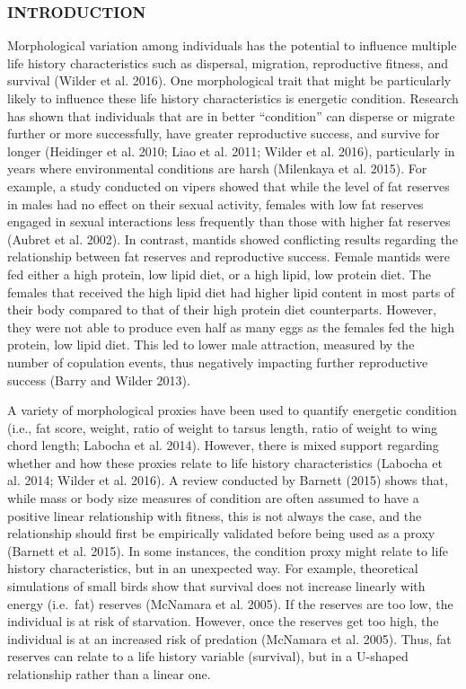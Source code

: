 \documentclass[
]{article}
\begin{document}
\hypertarget{introduction}{%
\subsubsection{INTRODUCTION}\label{introduction}}

Morphological variation among individuals has the potential to influence
multiple life history characteristics such as dispersal, migration,
reproductive fitness, and survival (Wilder et al. 2016). One
morphological trait that might be particularly likely to influence these
life history characteristics is energetic condition. Research has shown
that individuals that are in better ``condition'' can disperse or
migrate further or more successfully, have greater reproductive success,
and survive for longer (Heidinger et al. 2010; Liao et al. 2011; Wilder
et al. 2016), particularly in years where environmental conditions are
harsh (Milenkaya et al. 2015). For example, a study conducted on vipers
showed that while the level of fat reserves in males had no effect on
their sexual activity, females with low fat reserves engaged in sexual
interactions less frequently than those with higher fat reserves (Aubret
et al. 2002). In contrast, mantids showed conflicting results regarding
the relationship between fat reserves and reproductive success. Female
mantids were fed either a high protein, low lipid diet, or a high lipid,
low protein diet. The females that received the high lipid diet had
higher lipid content in most parts of their body compared to that of
their high protein diet counterparts. However, they were not able to
produce even half as many eggs as the females fed the high protein, low
lipid diet. This led to lower male attraction, measured by the number of
copulation events, thus negatively impacting further reproductive
success (Barry and Wilder 2013).

A variety of morphological proxies have been used to quantify energetic
condition (i.e., fat score, weight, ratio of weight to tarsus length,
ratio of weight to wing chord length; Labocha et al. 2014). However,
there is mixed support regarding whether and how these proxies relate to
life history characteristics (Labocha et al. 2014; Wilder et al. 2016).
A review conducted by Barnett (2015) shows that, while mass or body size
measures of condition are often assumed to have a positive linear
relationship with fitness, this is not always the case, and the
relationship should first be empirically validated before being used as
a proxy (Barnett et al. 2015). In some instances, the condition proxy
might relate to life history characteristics, but in an unexpected way.
For example, theoretical simulations of small birds show that survival
does not increase linearly with energy (i.e.~fat) reserves (McNamara et
al. 2005). If the reserves are too low, the individual is at risk of
starvation. However, once the reserves get too high, the individual is
at an increased risk of predation (McNamara et al. 2005). Thus, fat
reserves can relate to a life history variable (survival), but in a
U-shaped relationship rather than a linear one.
\end{document}
